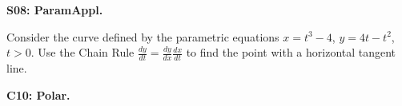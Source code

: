 \documentclass[12pt]{article}
\newcommand{\<}{\left\langle}
\renewcommand{\>}{\right\rangle}
\newcommand{\exerciseHeader}[4]{


  \vspace{0.5em}
  \textbf{#2}
  \vspace{0.5em}

}
\begin{document}
\begin{multicols}{2}
\exerciseHeader{2017 June 30}{S08: ParamAppl.}{
Parametrize a curve to find arclengths, surface areas, and slopes.
}{2/3}

Consider the curve defined by the parametric equations
\(x=t^3-4\), \(y=4t-t^2\), \(t>0\).
Use the Chain Rule \(\frac{dy}{dt}=\frac{dy}{dx}\frac{dx}{dt}\) to
find the point with a horizontal tangent line.



%

%

%

%

%

%

\exerciseHeader{2017 July 05}{C10: Polar.}{
Convert and sketch polar and Cartesian coordinates and equations.
}{2/4}


\end{multicols}
\end{document}
